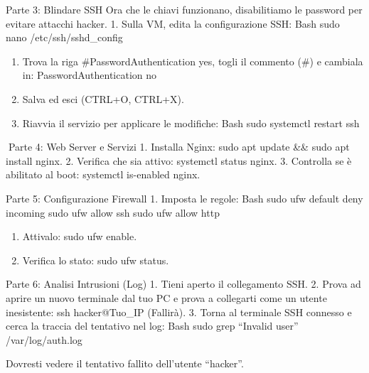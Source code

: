 \documentclass[11pt,a4paper]{article}
\providecommand{\tightlist}{%
  \setlength{\itemsep}{0pt}\setlength{\parskip}{0pt}}
\begin{document}
Parte 3: Blindare SSH Ora che le chiavi funzionano, disabilitiamo le
password per evitare attacchi hacker. 1. Sulla VM, edita la
configurazione SSH: Bash sudo nano /etc/ssh/sshd\_config

\begin{enumerate}
\def\labelenumi{\arabic{enumi}.}
\setcounter{enumi}{1}
\tightlist
\item
  Trova la riga \#PasswordAuthentication yes, togli il commento (\#) e
  cambiala in: PasswordAuthentication no
\item
  Salva ed esci (CTRL+O, CTRL+X).
\item
  Riavvia il servizio per applicare le modifiche: Bash sudo systemctl
  restart ssh
\end{enumerate}

Parte 4: Web Server e Servizi 1. Installa Nginx: sudo apt update \&\&
sudo apt install nginx. 2. Verifica che sia attivo: systemctl status
nginx. 3. Controlla se è abilitato al boot: systemctl is-enabled nginx.

Parte 5: Configurazione Firewall 1. Imposta le regole: Bash sudo ufw
default deny incoming sudo ufw allow ssh sudo ufw allow http

\begin{enumerate}
\def\labelenumi{\arabic{enumi}.}
\setcounter{enumi}{1}
\tightlist
\item
  Attivalo: sudo ufw enable.
\item
  Verifica lo stato: sudo ufw status.
\end{enumerate}

Parte 6: Analisi Intrusioni (Log) 1. Tieni aperto il collegamento SSH.
2. Prova ad aprire un nuovo terminale dal tuo PC e prova a collegarti
come un utente inesistente: ssh hacker@Tuo\_IP (Fallirà). 3. Torna al
terminale SSH connesso e cerca la traccia del tentativo nel log: Bash
sudo grep ``Invalid user'' /var/log/auth.log

Dovresti vedere il tentativo fallito dell'utente ``hacker''.


\end{document}
